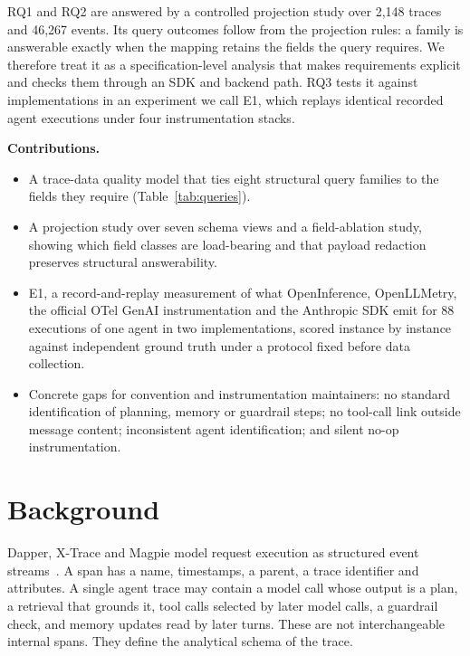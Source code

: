 \documentclass[conference]{IEEEtran}
\begin{document}
RQ1 and RQ2 are answered by a controlled projection study over 2,148
traces and 46,267 events. Its query outcomes follow from the projection
rules: a family is answerable exactly when the mapping retains the
fields the query requires. We therefore treat it as a specification-level
analysis that makes requirements explicit and checks them through an SDK
and backend path. RQ3 tests it against implementations in an experiment
we call E1, which replays identical recorded agent executions under four
instrumentation stacks.

\textbf{Contributions.}
\begin{itemize}[nosep,leftmargin=*]
\item A trace-data quality model that ties eight structural query
  families to the fields they require (Table~\ref{tab:queries}).
\item A projection study over seven schema views and a field-ablation
  study, showing which field classes are load-bearing and that payload
  redaction preserves structural answerability.
\item E1, a record-and-replay measurement of what OpenInference,
  OpenLLMetry, the official OTel GenAI instrumentation and the Anthropic
  SDK emit for 88 executions of one agent in two implementations, scored
  instance by instance against independent ground truth under a protocol
  fixed before data collection.
\item Concrete gaps for convention and instrumentation maintainers: no
  standard identification of planning, memory or guardrail steps; no
  tool-call link outside message content; inconsistent agent
  identification; and silent no-op instrumentation.
\end{itemize}

\section{Background}
\label{sec:background}

Dapper, X-Trace and Magpie model request execution as structured event
streams~\cite{dapper,xtrace,magpie}. A span has a name, timestamps, a
parent, a trace identifier and attributes. A single agent trace may
contain a model call whose output is a plan, a retrieval that grounds
it, tool calls selected by later model calls, a guardrail check, and
memory updates read by later turns. These are not interchangeable
internal spans. They define the analytical schema of the trace.
\end{document}
